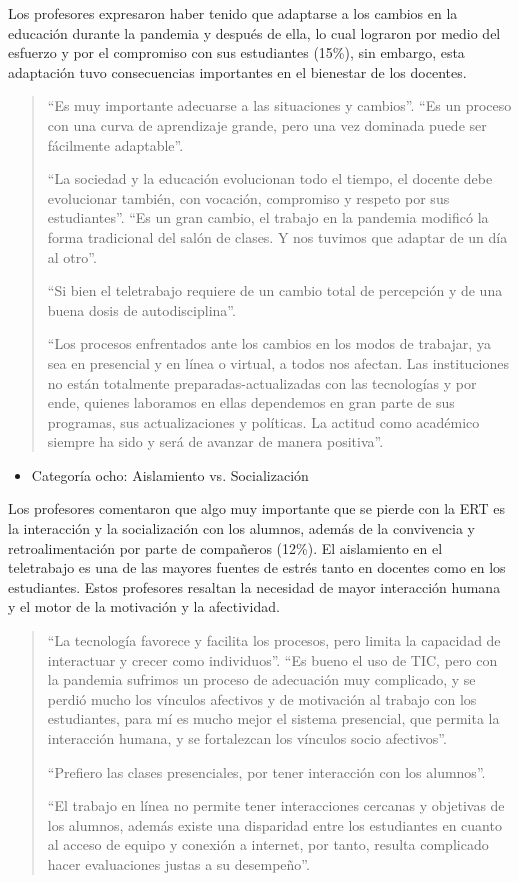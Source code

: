 \documentclass[spanish]{textolivre}
\begin{document}
Los profesores expresaron haber tenido que adaptarse a los cambios en la educación durante la pandemia y después de ella, lo cual lograron por medio del esfuerzo y por el compromiso con sus estudiantes (15\%), sin embargo, esta adaptación tuvo consecuencias importantes en el bienestar de los docentes.
\begin{quote}
 “Es muy importante adecuarse a las situaciones y cambios”. “Es un proceso con una curva de aprendizaje grande, pero una vez dominada puede ser fácilmente adaptable”. 
 
“La sociedad y la educación evolucionan todo el tiempo, el docente debe evolucionar también, con vocación, compromiso y respeto por sus estudiantes”. “Es un gran cambio, el trabajo en la pandemia modificó la forma tradicional del salón de clases. Y nos tuvimos que adaptar de un día al otro”. 

“Si bien el teletrabajo requiere de un cambio total de percepción y de una buena dosis de autodisciplina”. 

“Los procesos enfrentados ante los cambios en los modos de trabajar, ya sea en presencial y en línea o virtual, a todos nos afectan. Las instituciones no están totalmente preparadas-actualizadas con las tecnologías y por ende, quienes laboramos en ellas dependemos en gran parte de sus programas, sus actualizaciones y políticas. La actitud como académico siempre ha sido y será de avanzar de manera positiva”.
\end{quote}

\begin{itemize}
 \item Categoría ocho: Aislamiento vs. Socialización
\end{itemize}

Los profesores comentaron que algo muy importante que se pierde con la ERT es la interacción y la socialización con los alumnos, además de la convivencia y retroalimentación por parte de compañeros (12\%). El aislamiento en el teletrabajo es una de las mayores fuentes de estrés tanto en docentes como en los estudiantes. Estos profesores resaltan la necesidad de mayor interacción humana y el motor de la motivación y la afectividad.
\begin{quote}
 “La tecnología favorece y facilita los procesos, pero limita la capacidad de interactuar y crecer como individuos”. “Es bueno el uso de TIC, pero con la pandemia sufrimos un proceso de adecuación muy complicado, y se perdió mucho los vínculos afectivos y de motivación al trabajo con los estudiantes, para mí es mucho mejor el sistema presencial, que permita la interacción humana, y se fortalezcan los vínculos socio afectivos”.
 
“Prefiero las clases presenciales, por tener interacción con los alumnos”.

“El trabajo en línea no permite tener interacciones cercanas y objetivas de los alumnos, además existe una disparidad entre los estudiantes en cuanto al acceso de equipo y conexión a internet, por tanto, resulta complicado hacer evaluaciones justas a su desempeño”.
\end{quote}
\end{document}
